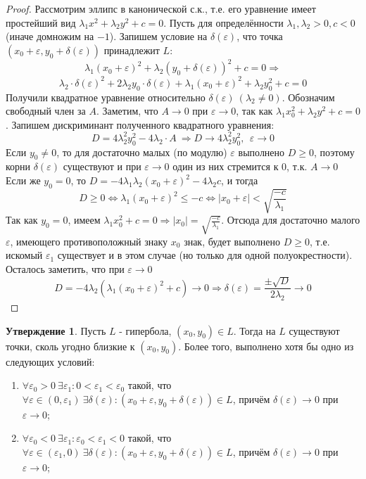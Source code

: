 \documentclass[a4paper, 12pt]{article}
\renewcommand{\epsilon}{\varepsilon}
\theoremstyle{definition}
\newtheorem*{subtheorem}{Утверждение}
\begin{document}
	\begin{proof}
		Рассмотрим эллипс в канонической с.к., т.е. его уравнение имеет простейший вид $\lambda_1x^2+\lambda_2y^2+c = 0$. Пусть для определённости $\lambda_1, \lambda_2 > 0, c < 0$ (иначе домножим на $-1$). Запишем условие на $\delta(\epsilon)$, что точка $(x_0 + \epsilon, y_0 + \delta(\epsilon))$ принадлежит $L$: $$\lambda_1(x_0 + \epsilon)^2+\lambda_2(y_0 + \delta(\epsilon))^2+c = 0\Rightarrow$$ $$\lambda_2\cdot\delta(\epsilon)^2 + 2\lambda_2y_0\cdot\delta(\epsilon) + \lambda_1(x_0 + \epsilon)^2 + \lambda_2y_0^2 + c = 0$$
		Получили квадратное уравнение относительно $\delta(\epsilon) \ (\lambda_2 \neq 0)$. Обозначим свободный член за $A$. Заметим, что $A \rightarrow 0$ при $\epsilon \rightarrow 0$, так как $\lambda_1x_0^2+\lambda_2y^2+c = 0$. Запишем дискриминант полученного квадратного уравнения: $$D = 4\lambda_2^2y_0^2 - 4\lambda_2\cdot A \ \Rightarrow D \rightarrow 4\lambda_2^2y_0^2, \ \ \epsilon \rightarrow 0$$
		Если $y_0 \neq 0$, то для достаточно малых (по модулю) $\epsilon$ выполнено $D \geqslant 0$, поэтому корни $\delta(\epsilon)$ существуют и при $\epsilon \rightarrow 0$ один из них стремится к 0, т.к. $A \rightarrow 0$\\
		Если же $y_0 = 0$, то $D = -4\lambda_1\lambda_2(x_0 + \epsilon)^2 - 4\lambda_2c$, и тогда $$D \geqslant 0 \Leftrightarrow \lambda_1(x_0 + \epsilon)^2 \leqslant -c \Leftrightarrow |x_0 + \epsilon| < \sqrt{\frac{-c}{\lambda_1}}$$ 
		Так как $y_0 = 0$, имеем $\lambda_1x_0^2+c = 0 \Rightarrow |x_0| = \sqrt{\frac{-c}{\lambda_1}}$. Отсюда для достаточно малого $\epsilon$, имеющего противоположный знаку $x_0$ знак, будет выполнено $D \geqslant 0$, т.е. искомый $\epsilon_1$ существует и в этом случае (но только для одной полуокрестности).
		Осталось заметить, что при $\epsilon \rightarrow 0$ $$D = -4\lambda_2(\lambda_1(x_0 + \epsilon)^2 + c) \rightarrow 0 \Rightarrow \delta(\epsilon) = \frac{\pm\sqrt{D}}{2\lambda_2} \rightarrow 0$$
	\end{proof}
	\begin{subtheorem}
		Пусть $L$ - гипербола, $(x_0, y_0) \in L$. Тогда на $L$ существуют точки, сколь угодно близкие к $(x_0, y_0)$. Более того, выполнено хотя бы одно из следующих условий:
		\begin{enumerate}
			\item $\forall \epsilon_0 > 0 \ \exists \epsilon_1: 0 < \epsilon_1 < \epsilon_0$ такой, что $\forall \epsilon \in (0, \epsilon_1) \ \exists \delta(\epsilon): (x_0 + \epsilon, y_0 + \delta(\epsilon)) \in L$, причём $\delta(\epsilon) \rightarrow 0$ при $\epsilon \rightarrow 0$;
			\item $\forall \epsilon_0 < 0 \ \exists \epsilon_1: \epsilon_0 < \epsilon_1 < 0$ такой, что $\forall \epsilon \in (\epsilon_1, 0) \ \exists \delta(\epsilon): (x_0 + \epsilon, y_0 + \delta(\epsilon)) \in L$, причём $\delta(\epsilon) \rightarrow 0$ при $\epsilon \rightarrow 0$;
		\end{enumerate} 
	\end{subtheorem}
\end{document}
